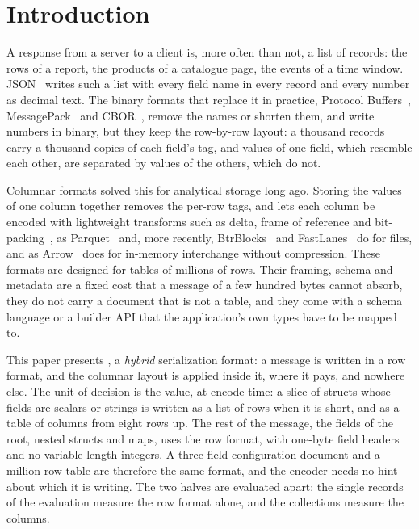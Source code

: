 \section{Introduction}
\label{sec:introduction}

A response from a server to a client is, more often than not, a list of
records: the rows of a report, the products of a catalogue page, the events of
a time window. JSON~\cite{rfc8259} writes such a list with every field name in
every record and every number as decimal text. The binary formats that replace
it in practice, Protocol Buffers~\cite{protobuf}, MessagePack~\cite{msgpack}
and CBOR~\cite{rfc8949}, remove the names or shorten them, and write numbers
in binary, but they keep the row-by-row layout: a thousand records carry a
thousand copies of each field's tag, and values of one field, which resemble
each other, are separated by values of the others, which do not.

Columnar formats solved this for analytical storage long ago. Storing the
values of one column together removes the per-row tags, and lets each column
be encoded with lightweight transforms such as delta, frame of reference and
bit-packing~\cite{zukowski2006pfor,lemire2015simdbp128}, as
Parquet~\cite{parquet} and, more recently, BtrBlocks~\cite{kuschewski2023btrblocks}
and FastLanes~\cite{afroozeh2023fastlanes} do for files, and as
Arrow~\cite{arrow} does for in-memory interchange without compression. These
formats are designed for tables of millions of rows. Their framing, schema and
metadata are a fixed cost that a message of a few hundred bytes cannot
absorb, they do not carry a document that is not a table, and they come with
a schema language or a builder API that the application's own types have to
be mapped to.

This paper presents \colbin{}, a \emph{hybrid} serialization format: a
message is written in a row format, and the columnar layout is applied
inside it, where it pays, and nowhere else. The unit of decision is the
value, at encode time: a slice of structs whose fields are scalars or
strings is written as a list of rows when it is short, and as a table of
columns from eight rows up. The rest of the message, the fields of the root,
nested structs and maps, uses the row format, with one-byte field headers
and no variable-length integers. A three-field configuration document and a
million-row table are therefore the same format, and the encoder needs no
hint about which it is writing. The two halves are evaluated apart: the
single records of the evaluation measure the row format alone, and the
collections measure the columns.

